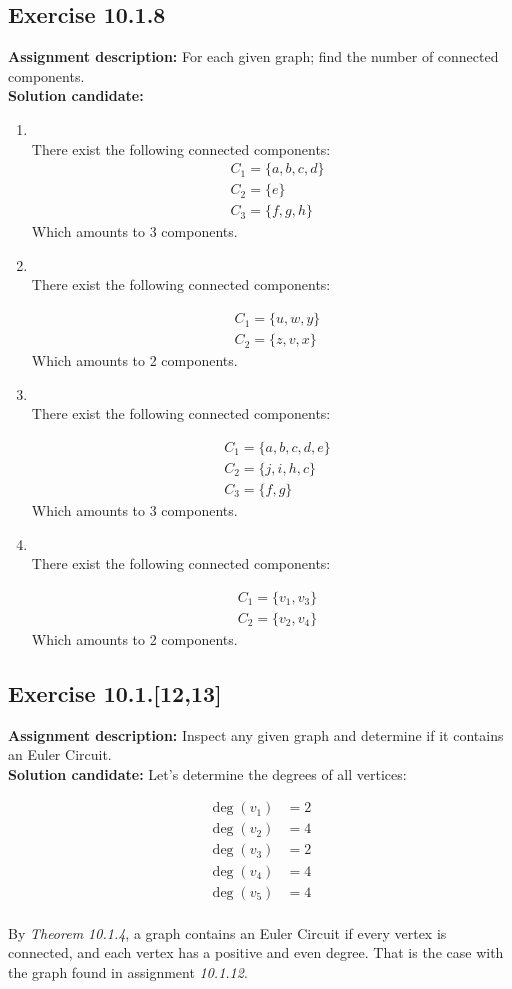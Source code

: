 \documentclass{report}
\newcommand{\mAlign}[1]{\begin{align*}#1\end{align*}}
\newcommand{\assignmentDescription}{\textbf{Assignment description: }}
\newcommand{\solution}{\textbf{Solution candidate: }}
\newcommand{\Exercise}[1]{\subsection{Exercise #1}}
\newcommand{\defaultEnumerateLabel}{\textbf{\alph*.}}
\newcommand{\emptyItem}{\item \,\\}
\begin{document}
	\Exercise{10.1.8}
	
	\assignmentDescription
	For each given graph; find the number of connected components.\\
	
	\solution
	\begin{enumerate}[label=\defaultEnumerateLabel]
		\emptyItem
		There exist the following connected components:
		\mAlign{&C_1 = \{a,b,c,d\}\\
					   &C_2 = \{e\} \\
				   	   &C_3=\{f,g,h\}}
  	   Which amounts to 3 components.
  	   
  	   \emptyItem
  	   There exist the following connected components:
  	   
  	   \mAlign{&C_1 = \{u,w,y\}\\
  	   	  			 &C_2 = \{z,v,x\}}
  	   Which amounts to 2 components.
		
		\emptyItem
		There exist the following connected components:
		
		\mAlign{&C_1 = \{a,b,c,d,e\}\\
			&C_2 = \{j,i,h,c\}\\
			&C_3 = \{f,g\}}
		Which amounts to 3 components.
		
		\emptyItem
		There exist the following connected components:
		
		\mAlign{&C_1 = \{v_1,v_3\}\\
			&C_2 = \{v_2,v_4\}}
		Which amounts to 2 components.
	\end{enumerate}
	
	\Exercise{10.1.[12,13]}
	
	\assignmentDescription
	Inspect any given graph and determine if it contains an Euler Circuit.\\
	
	\solution
	Let's determine the degrees of all vertices:
	
	\mAlign{\deg(v_1) &= 2 \\
				 \deg(v_2) &= 4 \\
		 		 \deg(v_3) &= 2 \\
		 		 \deg(v_4) &= 4 \\
		 		 \deg(v_5) &= 4 \\}
	 
	By \textit{Theorem 10.1.4}, a graph contains an Euler Circuit if every vertex is connected, and each vertex has a positive and even degree. That is the case with the graph found in assignment \textit{10.1.12}.\\
	
\end{document}
